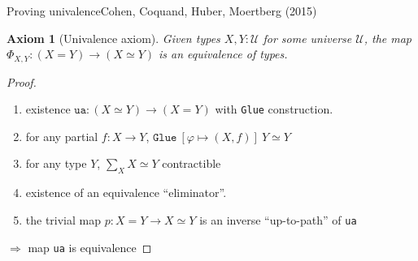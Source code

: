 \documentclass[english,draft]{beamer}
\newtheorem{axiom}[theorem]{Axiom}
\begin{document}
\begin{frame}{Proving univalence}{Cohen, Coquand, Huber, Moertberg (2015)}

\begin{axiom}[Univalence axiom]
 Given types $X,Y : \mathcal{U}$ for some universe $\mathcal{U}$, the map $\Phi_{X,Y}: (X=Y) \rightarrow (X \simeq Y)$ is an equivalence of types. 
\end{axiom}


 

\begin{proof}

\begin{enumerate}

\item existence $\texttt{ua} : (X\simeq Y) \rightarrow (X = Y)$ with \texttt{Glue} construction.

\item for any partial $f : X \rightarrow Y$, $\texttt{Glue} \ [\varphi \mapsto (X, f)] \ Y \simeq Y$

\item for any type $Y$, $\sum_{X} X \simeq Y$ contractible

\item existence of an equivalence ``eliminator''.

\item the trivial map $p : X = Y \rightarrow X \simeq Y$ is an inverse ``up-to-path'' of \texttt{ua}
%  
%  
 
 \end{enumerate}
 
    $\Rightarrow$ map \texttt{ua} is equivalence
\end{proof} 

\end{frame}
\end{document}
